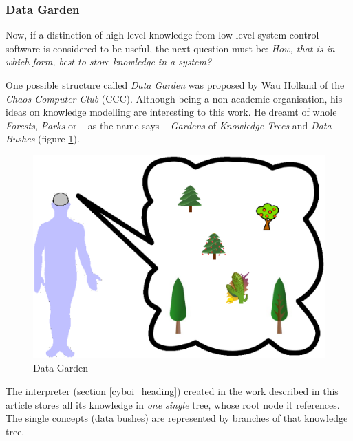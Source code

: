 %
%
%
%
%
%
%

\subsubsection{Data Garden}
\label{data_garden_heading}

Now, if a distinction of high-level knowledge from low-level system control
software is considered to be useful, the next question must be: \textit{How,
that is in which form, best to store knowledge in a system?}

One possible structure called \emph{Data Garden} \cite{holland} was proposed by
Wau Holland of the \emph{Chaos Computer Club} (CCC). Although being a
non-academic organisation, his ideas on knowledge modelling are interesting to
this work. He dreamt of whole \emph{Forests}, \emph{Parks} or -- as the name
says -- \emph{Gardens} of \emph{Knowledge Trees} and \emph{Data Bushes} (figure
\ref{garden_figure}).

\begin{figure}[ht]
    \begin{center}
        \includegraphics[scale=0.2]{vector/garden.eps}
        \caption{Data Garden}
        \label{garden_figure}
    \end{center}
\end{figure}

The interpreter (section \ref{cyboi_heading}) created in the work described in
this article stores all its knowledge in \emph{one single} tree, whose root
node it references. The single concepts (data bushes) are represented by
branches of that knowledge tree.
